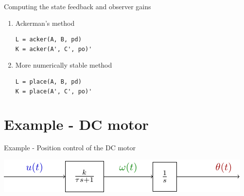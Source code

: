 \documentclass[presentation,aspectratio=169]{beamer}
\begin{document}
\begin{frame}[label={sec:org3c49faf},fragile]{Computing the state feedback and  observer gains}
 \begin{enumerate}
\item \alert{Ackerman's method} 
\begin{verbatim}
L = acker(A, B, pd)
K = acker(A', C', po)'
\end{verbatim}
\item \alert{More numerically stable method} 
\begin{verbatim}
L = place(A, B, pd)
K = place(A', C', po)'
\end{verbatim}
\end{enumerate}
\end{frame}

\section{Example - DC motor}
\label{sec:org47da4e6}
\begin{frame}[label={sec:org4ef50e1}]{Example - Position control of the DC motor}
\begin{center}
  \includegraphics[width=0.8\linewidth]{../../figures/block-DC}
\end{center}
\end{frame}
\end{document}
